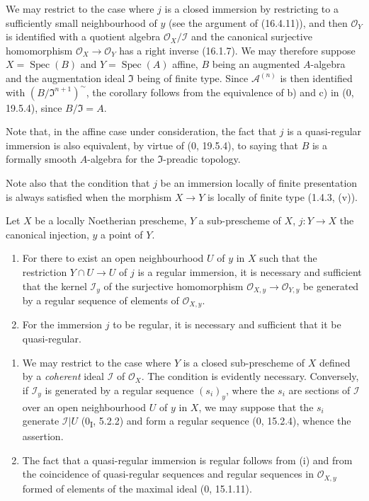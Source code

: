 We may restrict to the case where $j$ is a closed immersion by restricting
to a sufficiently small neighbourhood of $y$ (see the argument of (16.4.11)),
and then $\mathcal{O}_Y$ is identified with a quotient algebra
$\mathcal{O}_X/\mathscr{I}$ and the canonical surjective homomorphism
$\mathcal{O}_X\to\mathcal{O}_Y$ has a
right inverse (16.1.7). We may therefore suppose
$X=\operatorname{Spec}(B)$ and $Y=\operatorname{Spec}(A)$ affine, $B$ being
an augmented $A$-algebra and the augmentation ideal $\mathfrak{I}$ being of
finite type. Since $\mathscr{A}^{(n)}$ is then identified with
$(B/\mathfrak{I}^{n+1})^{\sim}$, the corollary follows from the equivalence
of b) and c) in (0, 19.5.4), since $B/\mathfrak{I}=A$.

Note that, in the affine case under consideration, the fact that $j$ is a
quasi-regular immersion is also equivalent, by virtue of (0, 19.5.4), to
saying that $B$ is a formally smooth $A$-algebra for the
$\mathfrak{I}$-preadic topology.

Note also that the condition that $j$ be an immersion locally of finite
presentation is always satisfied when the morphism $X\to Y$ is locally of
finite type (1.4.3, (v)).

\begin{proposition}[16.9.10]\label{IV.16.9.10}
Let $X$ be a locally Noetherian prescheme, $Y$ a sub-prescheme of $X$,
$j:Y\to X$ the canonical injection, $y$ a point of $Y$.
\begin{enumerate}
  \item[(i)] For there to exist an open neighbourhood $U$ of $y$ in $X$ such
  that the restriction $Y\cap U\to U$ of $j$ is a regular immersion, it is
  necessary and sufficient that the kernel $\mathscr{I}_y$ of the surjective
  homomorphism $\mathcal{O}_{X,y}\to\mathcal{O}_{Y,y}$ be generated by a
  regular sequence of elements of $\mathcal{O}_{X,y}$.
  \item[(ii)] For the immersion $j$ to be regular, it is necessary and
  sufficient that it be quasi-regular.
\end{enumerate}
\end{proposition}

\begin{enumerate}
  \item[(i)] We may restrict to the case where $Y$ is a closed sub-prescheme
  of $X$ defined by a \emph{coherent} ideal $\mathscr{I}$ of $\mathcal{O}_X$.
  The condition is evidently necessary. Conversely, if $\mathscr{I}_y$
  is generated by a regular sequence $(s_i)_y$, where the $s_i$ are
  sections of $\mathscr{I}$ over an open neighbourhood $U$ of $y$ in
  $X$, we may suppose that the $s_i$ generate $\mathscr{I}|U$
  (0\textsubscript{I}, 5.2.2) and form a regular sequence (0, 15.2.4),
  whence the assertion.
  \item[(ii)] The fact that a quasi-regular immersion is regular follows
  from (i) and from the coincidence of quasi-regular sequences and regular
  sequences in $\mathcal{O}_{X,y}$ formed of elements of the maximal ideal
  (0, 15.1.11).
\end{enumerate}

